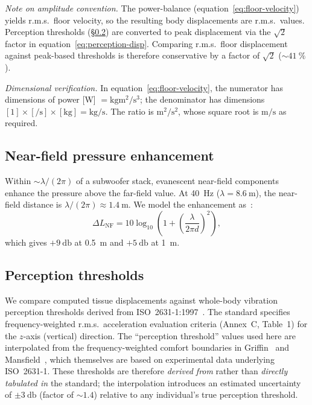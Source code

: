 \emph{Note on amplitude convention.}  The power-balance
(equation~\ref{eq:floor-velocity}) yields r.m.s.\ floor velocity, so the
resulting body displacements are r.m.s.\ values.  Perception thresholds
(\S\ref{sec:perception-model}) are converted to peak displacement via the
$\sqrt{2}$ factor in equation~\eqref{eq:perception-disp}.  Comparing
r.m.s.\ floor displacement against peak-based thresholds is therefore
conservative by a factor of $\sqrt{2}$ (${\sim}\SI{41}{\percent}$).

\emph{Dimensional verification.}  In equation~\eqref{eq:floor-velocity},
the numerator has dimensions of power [\si{\watt}] $=
\si{\kilogram\metre\squared\per\second\cubed}$; the denominator has
dimensions $[1]\times[\si{\per\second}]\times[\si{\kilogram}] =
\si{\kilogram\per\second}$.  The ratio is
$\si{\metre\squared\per\second\squared}$, whose square root is
$\si{\metre\per\second}$ as required.

\subsection{Near-field pressure enhancement}
\label{sec:near-field}

Within ${\sim}\lambda/(2\pi)$ of a subwoofer stack, evanescent
near-field components enhance the pressure above the far-field value.
At \SI{40}{\hertz} ($\lambda = \SI{8.6}{\metre}$), the near-field
distance is $\lambda/(2\pi) \approx \SI{1.4}{\metre}$.  We model the
enhancement as~\cite{Junger2012}:
%
\begin{equation}
  \Delta L_\mathrm{NF} = 10\log_{10}\!\left(1 +
    \left(\frac{\lambda}{2\pi d}\right)^2\right),
  \label{eq:near-field}
\end{equation}
%
which gives $+\SI{9}{\decibel}$ at \SI{0.5}{\metre} and
$+\SI{5}{\decibel}$ at \SI{1}{\metre}.

\subsection{Perception thresholds}
\label{sec:perception-model}

We compare computed tissue displacements against whole-body vibration
perception thresholds derived from ISO~2631-1:1997~\cite{iso2631}.
The standard specifies frequency-weighted r.m.s.\ acceleration
evaluation criteria (Annex~C, Table~1) for the $z$-axis (vertical)
direction.  The ``perception threshold'' values used here are
interpolated from the frequency-weighted comfort boundaries in
Griffin~\cite{Griffin1990} and Mansfield~\cite{Mansfield2005}, which
themselves are based on experimental data underlying
ISO~2631-1.  These thresholds are therefore \emph{derived from} rather
than \emph{directly tabulated in} the standard; the interpolation
introduces an estimated uncertainty of ${\pm}\SI{3}{\decibel}$ (factor
of ${\sim}1.4$) relative to any individual's true perception threshold.

